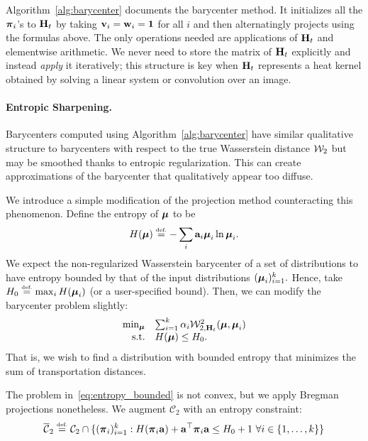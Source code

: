Algorithm~\ref{alg:barycenter} documents the barycenter method.  It initializes all the $\boldsymbol{\pi}_i$'s to $\mathbf{H}_t$ by taking $\mathbf v_i=\mathbf w_i=\mathbf 1$ for all $i$ and then alternatingly projects using the formulas above.  The only operations needed are applications of $\mathbf{H}_t$ and elementwise arithmetic.  We never need to store the matrix of $\mathbf{H}_t$ explicitly and instead \emph{apply} it iteratively; this structure is key when $\mathbf{H}_t$ represents a heat kernel obtained by solving a linear system or convolution over an image.

\paragraph{Entropic Sharpening.} Barycenters computed using Algorithm~\ref{alg:barycenter} have similar qualitative structure to barycenters with respect to the true Wasserstein distance $\mathcal W_2$ but may be smoothed thanks to entropic regularization.  This can create approximations of the barycenter that qualitatively appear too diffuse.

We introduce a simple modification of the projection method counteracting this phenomenon.  Define the entropy of $\boldsymbol{\mu}$ to be
$$H(\p) \eqdef -\sum_i \a_i \p_i\ln\p_i.$$
We expect the non-regularized Wasserstein barycenter of a set of distributions to have entropy bounded by that of the input distributions $(\boldsymbol{\mu}_i)_{i=1}^k.$  Hence, take $H_0\eqdef \max_i H(\p_i)$ (or a user-specified bound).  Then, we can modify the barycenter problem slightly:
\begin{equation}\label{eq:entropy_bounded}
\begin{array}{rl}
\min_{\p} & \sum_{i=1}^k \alpha_i\W^2_{2,\kernel}(\p,\p_i)\\
\textrm{s.t.} %
& H(\p)\leq H_0.
\end{array}
\end{equation}
That is, we wish to find a distribution with bounded entropy that minimizes the sum of transportation distances.

The problem in~\eqref{eq:entropy_bounded} is not convex, but we apply Bregman projections nonetheless.  We augment $\mathcal C_2$ with an entropy constraint:
$$\overline {\mathcal C}_2\eqdef \mathcal C_2\cap \{(\bpi_i)_{i=1}^k:H(\bpi_i\a)+\a^\top \bpi_i\a\leq H_0+1\ \forall i\in\{1,\ldots,k\}\}$$

